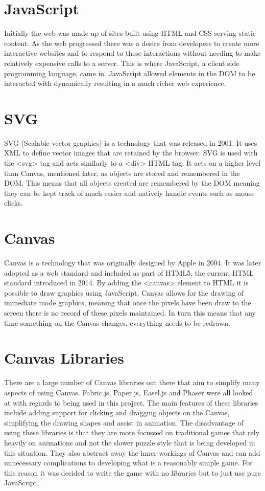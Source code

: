 \documentclass[12pt,a4paper]{report}
\begin{document}
\section{JavaScript}
Initially the web was made up of sites built using HTML and CSS serving static content. As the web progressed there was a desire from developers to create more interactive websites and to respond to these interactions without needing to make relatively expensive calls to a server. This is where JavaScript, a client side programming language, came in. JavaScript allowed elements in the DOM to be interacted with dynamically resulting in a much richer web experience.

\section{SVG}
SVG (Scalable vector graphics) is a technology that was released in 2001. 
It uses XML to define vector images that are retained by the browser. SVG is used with the <svg> tag and acts similarly to a <div> HTML tag. It acts on a higher level than Canvas, mentioned later, as objects are stored and remembered in the DOM. This means that all objects created are remembered by the DOM meaning they can be kept track of much easier and natively handle events such as mouse clicks.

\section{Canvas}
Canvas is a technology that was originally designed by Apple in 2004. It was later adopted as a web standard and included as part of HTML5, the current HTML standard introduced in 2014. By adding the <canvas> element to HTML it is possible to draw graphics using JavaScript. Canvas allows for the drawing of immediate mode graphics, meaning that once the pixels have been draw to the screen there is no record of these pixels maintained. In turn this means that any time something on the Canvas changes, everything needs to be redrawn. 

\section{Canvas Libraries}
There are a large number of Canvas libraries out there that aim to simplify many aspects of using Canvas. Fabric.js, Paper.js, Easel.js and Phaser were all looked at with regards to being used in this project. The main features of these libraries include adding support for clicking and dragging objects on the Canvas, simplifying the drawing shapes and assist in animation.
The disadvantage of using these libraries is that they are more focussed on traditional games that rely heavily on animations and not the slower puzzle style that is being developed in this situation. They also abstract away the inner workings of Canvas and can add unnecessary complications to developing what is a reasonably simple game. For this reason it was decided to write the game with no libraries but to just use pure JavaScript.
\end{document}
